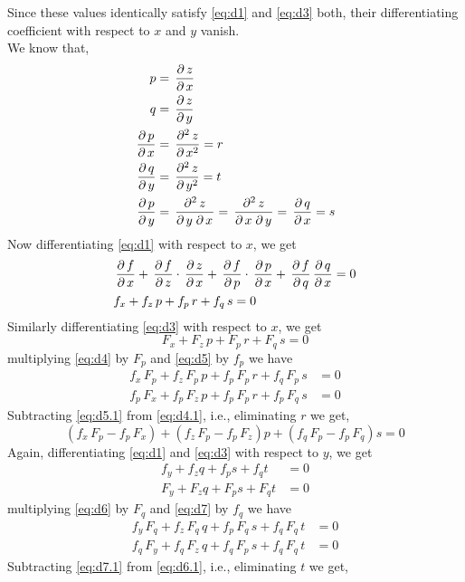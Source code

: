 \documentclass[../main-sheet.tex]{subfiles}
\begin{document}
Since these values identically satisfy \eqref{eq:d1} and \eqref{eq:d3} both, their differentiating coefficient with respect to \(x\) and \(y\) vanish.\\
We know that,
\begin{align*}
    p&=\pdx{z}\\
    q&=\pdy{z}\\
    \pdx{p}&=\pdn{z}{x}{2}{2}=r\\
    \pdy{q}&=\pdn{z}{y}{2}{2}=t\\
    \pdy{p}&=\pdn{z}{y\;\partial\,x}{2}{}=\pdn{z}{x\;\partial\, y}{2}{}=\pdx{q}=s
\end{align*}
Now differentiating \eqref{eq:d1} with respect to \(x\), we get
\begin{align}
    &\pdx{f}+\pdz{f}\cdot\pdx{z}+\pd{f}{p}\cdot\pdx{p}+\pd{f}{q}\pdx{q}=0\notag\\
    &f_x+f_z\,p+f_p\,r+f_q\,s=0\label{eq:d4}
\end{align}
Similarly differentiating \eqref{eq:d3} with respect to \(x\), we get
\begin{equation}
    F_x+F_z\,p+F_p\,r+F_q\,s=0\label{eq:d5}
\end{equation}
multiplying \eqref{eq:d4} by \(F_p\) and \eqref{eq:d5} by \(f_p\) we have
\begin{align}
    f_x\,F_p+f_z\,F_p\,p+f_p\,F_p\,r+f_q\,F_p\,s&=0\label{eq:d4.1}\\
    f_p\,F_x+f_p\,F_z\,p+f_p\,F_p\,r+f_p\,F_q\,s&=0\label{eq:d5.1}
\end{align}
Subtracting \eqref{eq:d5.1} from \eqref{eq:d4.1}, i.e., eliminating \(r\) we get,
\begin{equation}
    (f_x\,F_p-f_p\,F_x)+(f_z\,F_p-f_p\,F_z)p+(f_q\,F_p-f_p\,F_q)s=0 \label{eq:db}
\end{equation}
Again, differentiating \eqref{eq:d1} and \eqref{eq:d3} with respect to \(y\), we get
\begin{align}
    f_y+f_zq+f_ps+f_qt&=0\label{eq:d6}\\
    F_y+F_zq+F_ps+F_qt&=0\label{eq:d7}
\end{align}
multiplying \eqref{eq:d6} by \(F_q\) and \eqref{eq:d7} by \(f_q\) we have
\begin{align}
    f_y\,F_q+f_z\,F_q\,q+f_p\,F_q\,s+f_q\,F_q\,t&=0\label{eq:d6.1}\\
    f_q\,F_y+f_q\,F_z\,q+f_q\,F_p\,s+f_q\,F_q\,t&=0\label{eq:d7.1}
\end{align}
Subtracting \eqref{eq:d7.1} from \eqref{eq:d6.1}, i.e., eliminating \(t\) we get,
\end{document}
